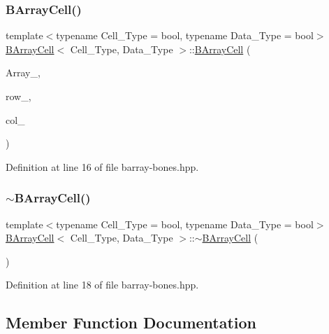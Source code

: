 \subsubsection{\texorpdfstring{B\+Array\+Cell()}{BArrayCell()}}
{\footnotesize\ttfamily template$<$typename Cell\+\_\+\+Type = bool, typename Data\+\_\+\+Type = bool$>$ \\
\hyperlink{class_b_array_cell}{B\+Array\+Cell}$<$ Cell\+\_\+\+Type, Data\+\_\+\+Type $>$\+::\hyperlink{class_b_array_cell}{B\+Array\+Cell} (\begin{DoxyParamCaption}\item[{\hyperlink{class_b_array}{B\+Array}$<$ Cell\+\_\+\+Type, Data\+\_\+\+Type $>$ $\ast$}]{Array\+\_\+,  }\item[{\hyperlink{typedefs_8hpp_a91ad9478d81a7aaf2593e8d9c3d06a14}{uint}}]{row\+\_\+,  }\item[{\hyperlink{typedefs_8hpp_a91ad9478d81a7aaf2593e8d9c3d06a14}{uint}}]{col\+\_\+ }\end{DoxyParamCaption})\hspace{0.3cm}{\ttfamily [inline]}}



Definition at line 16 of file barray-\/bones.\+hpp.

\mbox{\label{class_b_array_cell_a6fbc56424caade490a72685cc35ad0e9}} 
\subsubsection{\texorpdfstring{$\sim$\+B\+Array\+Cell()}{~BArrayCell()}}
{\footnotesize\ttfamily template$<$typename Cell\+\_\+\+Type = bool, typename Data\+\_\+\+Type = bool$>$ \\
\hyperlink{class_b_array_cell}{B\+Array\+Cell}$<$ Cell\+\_\+\+Type, Data\+\_\+\+Type $>$\+::$\sim$\hyperlink{class_b_array_cell}{B\+Array\+Cell} (\begin{DoxyParamCaption}{ }\end{DoxyParamCaption})\hspace{0.3cm}{\ttfamily [inline]}}



Definition at line 18 of file barray-\/bones.\+hpp.



\subsection{Member Function Documentation}
\mbox{\label{class_b_array_cell_a726de4e638ec37b1147d737809765953}} 
